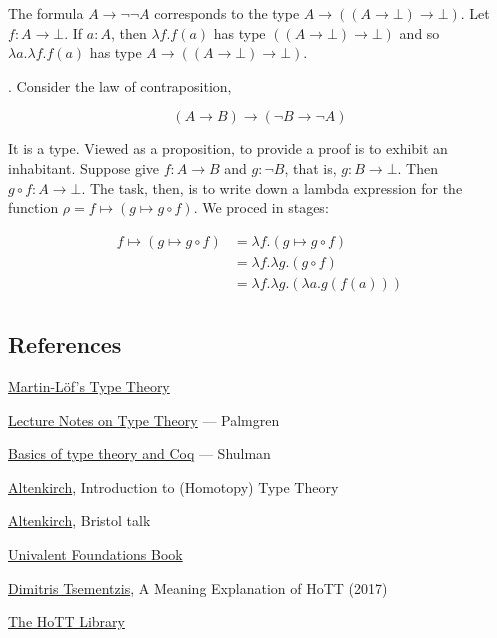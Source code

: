  The formula $A \to \neg \neg A$ corresponds to the type $A \to ((A \to \bot) \to \bot)$.  Let $f : A \to \bot$. If $a:A$, then $\lambda f . f(a)$ has type $((A \to \bot) \to \bot)$ and so $\lambda a. \lambda f . f(a)$ has type  $A \to ((A \to \bot) \to \bot)$.




. Consider the law of contraposition,

$$
(A \to B) \to (\neg B \to \neg A)
$$

It is a type.  Viewed as a proposition, to provide a proof is to exhibit an inhabitant.  Suppose give $f : A \to B$ and $g : \neg B$, that is, 
$g : B \to \bot$.  Then $g\circ f : A \to \bot$.  The task, then, is to write down a lambda expression for the function $\rho =  f \mapsto (g \mapsto g\circ f)$.  We proced in stages:

\begin{align}
f \mapsto (g \mapsto g\circ f) & = \lambda f .(g \mapsto g\circ f)\\
 & = \lambda f . \lambda g . (g\circ f) \\
& = \lambda f . \lambda g . (\lambda a. g(f(a))) \\
\end{align}

\subsection{References}

\href{http://www.cse.chalmers.se/~smith/handbook.pdf}{Martin-Löf's Type Theory}

\href{http://staff.math.su.se/palmgren/lecturenotesTT.pdf}{Lecture Notes on Type Theory} — Palmgren

\href{https://home.sandiego.edu/~shulman/hottseminar2012/02typetheory-handout2up.pdf}{Basics of type theory and Coq} — Shulman

\href{http://www.cs.nott.ac.uk/~psztxa/talks/fmv18.pdf}{Altenkirch}, Introduction to (Homotopy) Type Theory

\href{http://www.cs.nott.ac.uk/~psztxa/talks/bristol-16.pdf}{Altenkirch}, Bristol talk

\href{https://www.heidelberg-laureate-forum.org/wp-content/uploads/2013/10/Homotopy-Type-Theory_Univalent-Foundations-of-Mathematics.pdf}{Univalent Foundations Book}

\href{http://philsci-archive.pitt.edu/12824/1/A.Meaning.Explanation.for.HoTT.pdf}{Dimitris Tsementzis}, A Meaning Explanation of HoTT (2017)

\href{https://www.researchgate.net/publication/312243911_The_HoTT_library_a_formalization_of_homotopy_type_theory_in_Coq}{The HoTT Library}
